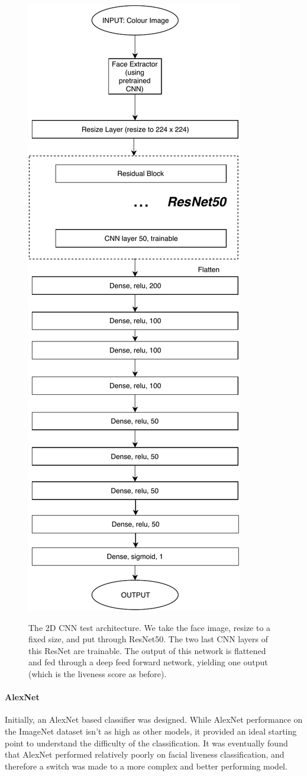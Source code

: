 \documentclass[10pt,a4paper]{article}
\begin{document}
            \begin{figure}
                \centering
                \includegraphics[width=0.5\linewidth]{2DCNNArchitecture.pdf}
                \label{2DCNNArchitecture}
                \caption{The 2D CNN test architecture. We take the face image, resize to a fixed size, and put through ResNet50. The two last CNN layers
                of this ResNet are trainable. The output of this network is flattened and fed through a deep feed forward network, yielding one output (which is the
                liveness score as before).}
            \end{figure}


            \paragraph{AlexNet}
            Initially, an AlexNet based classifier was designed. While AlexNet performance on the ImageNet dataset isn't as high as other models, it provided an ideal starting point to understand the difficulty
            of the classification. It was eventually found that AlexNet performed relatively poorly on facial liveness classification, and therefore a switch was made to a more complex and better performing model.
\end{document}
